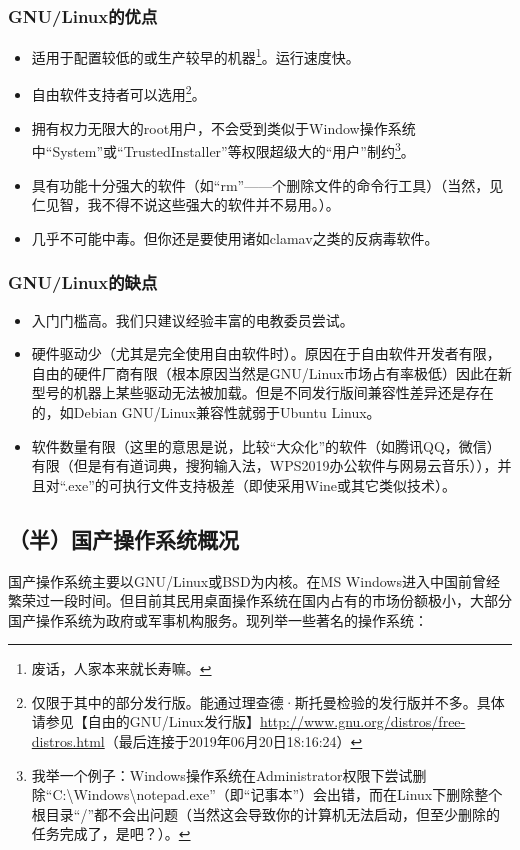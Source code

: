 \documentclass{book}
\begin{document}
\subsubsection{GNU/Linux的优点}
\begin{itemize}
	\item  适用于配置较低的或生产较早的机器\footnote{废话，人家本来就长寿嘛。}。运行速度快。\par
	\item 自由软件支持者可以选用\footnote{仅限于其中的部分发行版。能通过理查德·斯托曼检验的发行版并不多。具体请参见【自由的GNU/Linux发行版】\url{http://www.gnu.org/distros/free-distros.html}（最后连接于2019年06月20日18:16:24）}。\par
	\item 拥有权力无限大的root用户，不会受到类似于Window操作系统中“System”或“TrustedInstaller”等权限超级大的“用户”制约\footnote{我举一个例子：Windows操作系统在Administrator权限下尝试删除“C:\textbackslash Windows\textbackslash notepad.exe”（即“记事本”）会出错，而在Linux下删除整个根目录“/”都不会出问题（当然这会导致你的计算机无法启动，但至少删除的任务完成了，是吧？）。}。\par
	\item 具有功能十分强大的软件（如“rm”——个删除文件的命令行工具）（当然，见仁见智，我不得不说这些强大的软件并不易用。）。
	\item 几乎不可能中毒。但你还是要使用诸如clamav之类的反病毒软件。
\end{itemize}
\subsubsection{GNU/Linux的缺点}
\begin{itemize}
	\item 入门门槛高。我们只建议经验丰富的电教委员尝试。
	\item 硬件驱动少（尤其是完全使用自由软件时）。原因在于自由软件开发者有限，自由的硬件厂商有限（根本原因当然是GNU/Linux市场占有率极低）因此在新型号的机器上某些驱动无法被加载。但是不同发行版间兼容性差异还是存在的，如Debian GNU/Linux兼容性就弱于Ubuntu Linux。
	\item 软件数量有限（这里的意思是说，比较“大众化”的软件（如腾讯QQ，微信）有限（但是有有道词典，搜狗输入法，WPS2019办公软件与网易云音乐）），并且对“.exe”的可执行文件支持极差（即使采用Wine或其它类似技术）。	
\end{itemize}
\subsection{（半）国产操作系统概况}
国产操作系统主要以GNU/Linux或BSD为内核。在MS Windows进入中国前曾经繁荣过一段时间。但目前其民用桌面操作系统在国内占有的市场份额极小，大部分国产操作系统为政府或军事机构服务。现列举一些著名的操作系统：
\end{document}
